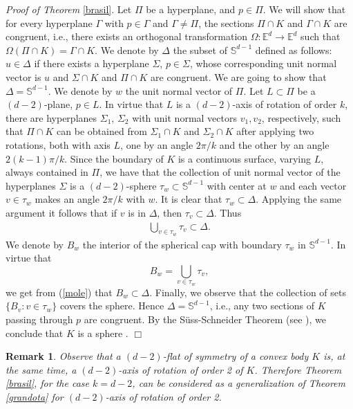\documentclass[12pt,thmsa]{amsart}
\newcommand{\Ed}{\mathbb{E}^{d}}
\newtheorem{remark}{Remark}
\begin{document}
\textit{Proof of Theorem} \ref{brasil}.  
Let $\Pi$ be a hyperplane, and $p\in \Pi$. We will show that for every hyperplane $\Gamma$ with $p\in \Gamma$ and $\Gamma\not=\Pi$,  the sections $\Pi \cap K $ and $\Gamma \cap K$ are congruent, i.e., there exists an orthogonal transformation 
$\Omega: \Ed \rightarrow \Ed$ such  that $\Omega(\Pi \cap K) =\Gamma \cap K$. We denote by $\Delta$ the subset  of $\mathbb{S}^{d-1}$ defined as follows:  $u\in \Delta$ if there exists a hyperplane $\Sigma$, $p\in \Sigma$, whose corresponding unit normal vector is $u$ and $\Sigma \cap K$ and $\Pi \cap K$ are congruent. We are going to show that $\Delta =\mathbb{S}^{d-1}$. We denote by $w$ the unit normal vector of $\Pi$. Let $L\subset \Pi$ be a  $(d-2)$-plane, $p\in L$. In virtue that $L$ is a $(d-2)$-axis of rotation of order $k$, there  are hyperplanes 
$\Sigma_1$, $\Sigma_2$ with unit normal vectors $v_1,v_2$, respectively, such that $\Pi \cap K$ can be obtained from $\Sigma_1 \cap K$ and $\Sigma_2 \cap K$ after applying two rotations, both with axis $L$, one by an angle $2\pi/k$ and the other by an angle $2(k-1)\pi/k$. Since the boundary of $K$ is a continuous surface, varying $L$, always  contained in  
$\Pi$, we have that the collection of unit normal vector of the hyperplanes $\Sigma$ is a  $(d-2)$-sphere $\tau_{w}\subset \mathbb{S}^{d-1}$ with center at $w$ and each vector $v\in \tau_{w}$ makes an angle $2\pi/k$ with $w$. It is clear that $\tau_{w}\subset \Delta$. Applying the same argument it follows that if $v$ is in $\Delta$, then $\tau_v \subset \Delta$. Thus 
\begin{eqnarray}\label{mole}
\bigcup_{v\in \tau_{w}} \tau_{v}\subset \Delta.
\end{eqnarray}
We denote by $B_w$ the interior of the  spherical cap with boundary $\tau_{w}$ in $\mathbb{S}^{d-1}$. In virtue that 
\[
B_w=\bigcup_{v\in \tau_{w}} \tau_{v},
\]
we get from (\ref{mole}) that $B_w \subset \Delta$. Finally, we observe that the collection of sets $\{B_v:v\in \tau_w\}$ covers the sphere. Hence $\Delta = \mathbb{S}^{d-1}$, i.e., any two sections of $K$ passing through $p$ are congruent.  By the S\"uss-Schneider  Theorem (see \cite{schneider, suss}), we conclude that $K$ is a sphere . $\Box$    
 




\begin{remark}
Observe that a $(d-2)$-flat of symmetry of a convex body $K$ is, at the same time, a $(d-2)$-axis of rotation of order 2 of $K$. Therefore Theorem \ref{brasil}, for the case $k=d-2$, can be considered as a generalization of Theorem \ref{grandota} for $(d-2)$-axis of rotation of order 2. 
\end{remark}
\end{document}
